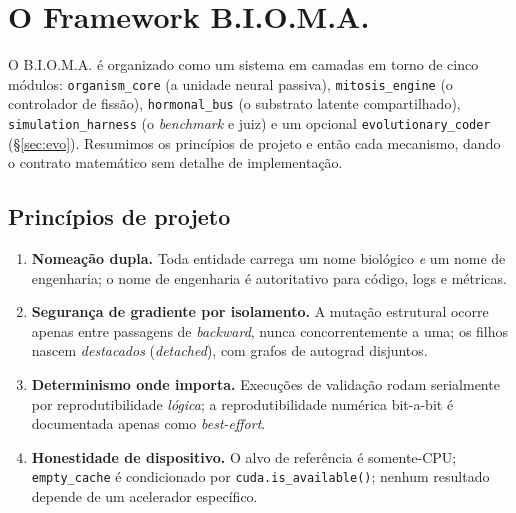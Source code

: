 \documentclass[11pt]{article}
\newcommand{\bioma}{\textsc{B.I.O.M.A.}}
\begin{document}
\section{O Framework \bioma{}}
\label{sec:framework}
O \bioma{} é organizado como um sistema em camadas em torno de cinco módulos:
\texttt{organism\_core} (a unidade neural passiva), \texttt{mitosis\_engine} (o
controlador de fissão), \texttt{hormonal\_bus} (o substrato latente
compartilhado), \texttt{simulation\_harness} (o \emph{benchmark} e juiz) e um
opcional \texttt{evolutionary\_coder} (\S\ref{sec:evo}). Resumimos os princípios
de projeto e então cada mecanismo, dando o contrato matemático sem detalhe de
implementação.

\subsection{Princípios de projeto}
\begin{enumerate}[leftmargin=1.4em,itemsep=2pt]
\item \textbf{Nomeação dupla.} Toda entidade carrega um nome biológico \emph{e}
um nome de engenharia; o nome de engenharia é autoritativo para código, logs e
métricas.
\item \textbf{Segurança de gradiente por isolamento.} A mutação estrutural ocorre
apenas entre passagens de \emph{backward}, nunca concorrentemente a uma; os
filhos nascem \emph{destacados} (\emph{detached}), com grafos de autograd
disjuntos.
\item \textbf{Determinismo onde importa.} Execuções de validação rodam
serialmente por reprodutibilidade \emph{lógica}; a reprodutibilidade numérica
bit-a-bit é documentada apenas como \emph{best-effort}.
\item \textbf{Honestidade de dispositivo.} O alvo de referência é somente-CPU;
\texttt{empty\_cache} é condicionado por \texttt{cuda.is\_available()}; nenhum
resultado depende de um acelerador específico.
\end{enumerate}
\end{document}
